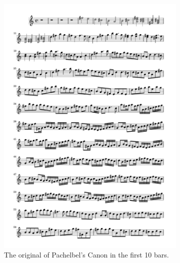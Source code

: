 \documentclass[11pt]{article}
\theoremstyle{definition}
\begin{document}
\begin{figure}
\begin{subfigure}{\textwidth}
\centering
\includegraphics[trim=1cm 26.5cm 1cm 0.5cm, clip, scale=0.8]{Original_CND.pdf}
\caption{The original of Pachelbel's Canon in the first 10 bars.} 
\label{fig:OCND}
\end{subfigure}
\begin{subfigure}{\textwidth}
\centering

\end{subfigure}
\end{figure}
\end{document}
